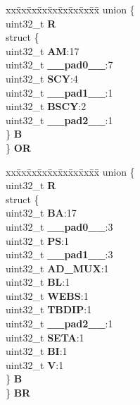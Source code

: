 \begin{DoxyCompactItemize}
\begin{tabbing}
\end{tabbing}\item 
\mbox{\label{structEBI__CAL__CS__tag_ae38da6e5a30766c37533fcaa6f0d522a}} 
\begin{tabbing}
xx\=xx\=xx\=xx\=xx\=xx\=xx\=xx\=xx\=\kill
union \{\\
\>uint32\_t {\bfseries R}\\
\>struct \{\\
\>\>uint32\_t {\bfseries AM}:17\\
\>\>uint32\_t {\bfseries \_\_pad0\_\_}:7\\
\>\>uint32\_t {\bfseries SCY}:4\\
\>\>uint32\_t {\bfseries \_\_pad1\_\_}:1\\
\>\>uint32\_t {\bfseries BSCY}:2\\
\>\>uint32\_t {\bfseries \_\_pad2\_\_}:1\\
\>\} {\bfseries B}\\
\} {\bfseries OR}\\

\end{tabbing}\item 
\mbox{\label{structEBI__CAL__CS__tag_ab6653dc11e7ac95ae16d8023c6150fb2}} 
\begin{tabbing}
xx\=xx\=xx\=xx\=xx\=xx\=xx\=xx\=xx\=\kill
union \{\\
\>uint32\_t {\bfseries R}\\
\>struct \{\\
\>\>uint32\_t {\bfseries BA}:17\\
\>\>uint32\_t {\bfseries \_\_pad0\_\_}:3\\
\>\>uint32\_t {\bfseries PS}:1\\
\>\>uint32\_t {\bfseries \_\_pad1\_\_}:3\\
\>\>uint32\_t {\bfseries AD\_MUX}:1\\
\>\>uint32\_t {\bfseries BL}:1\\
\>\>uint32\_t {\bfseries WEBS}:1\\
\>\>uint32\_t {\bfseries TBDIP}:1\\
\>\>uint32\_t {\bfseries \_\_pad2\_\_}:1\\
\>\>uint32\_t {\bfseries SETA}:1\\
\>\>uint32\_t {\bfseries BI}:1\\
\>\>uint32\_t {\bfseries V}:1\\
\>\} {\bfseries B}\\
\} {\bfseries BR}\\


\end{tabbing}
\end{DoxyCompactItemize}
